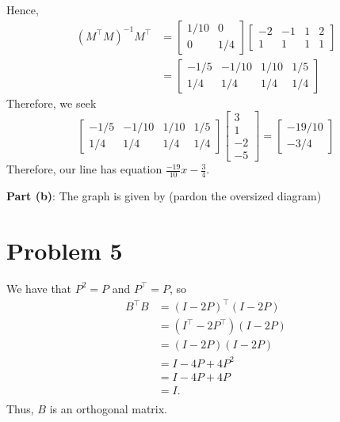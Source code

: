 \documentclass[11pt]{article}
\begin{document}
Hence,
\begin{align*}
	(M^{\top}M)^{-1}M^{\top} &= \begin{bmatrix} 1/10 & 0 \\ 0 & 1/4 \end{bmatrix} \begin{bmatrix} -2 & -1 & 1 & 2 \\ 1 & 1 & 1 & 1 \end{bmatrix} \\
							 &= \begin{bmatrix} -1/5 & -1/10 & 1/10 & 1/5 \\ 1/4 & 1/4 & 1/4 & 1/4 \end{bmatrix}	
\end{align*}
Therefore, we seek
\[
	\begin{bmatrix} -1/5 & -1/10 & 1/10 & 1/5 \\ 1/4 & 1/4 & 1/4 & 1/4 \end{bmatrix} \begin{bmatrix} 3 \\ 1 \\ -2 \\ -5 \end{bmatrix} = \begin{bmatrix} -19/10 \\ -3/4 \end{bmatrix}
\]
Therefore, our line has equation $\boxed{\frac{-19}{10}x - \frac{3}{4}}$.

\textbf{Part (b)}: The graph is given by (pardon the oversized diagram)



\section{Problem 5}
We have that $P^{2} = P$ and $P^{\top} = P$, so 
\begin{align*}
	B^{\top}B &= (I - 2P)^{\top} (I - 2P) \\
			  &= (I^{\top} - 2P^{\top})(I - 2P) \\
			  &= (I - 2P)(I - 2P) \\
			  &= I - 4P + 4P^{2} \\
			  &= I - 4P + 4P \\
			  &= I. \\
\end{align*}
Thus, $B$ is an orthogonal matrix.
\end{document}
